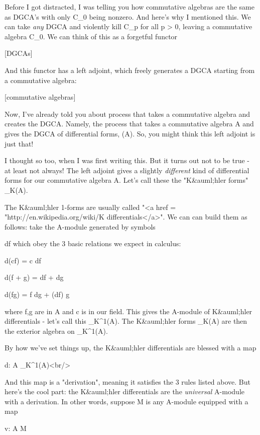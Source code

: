 Before I got distracted, I was telling you how commutative algebras
are the same as DGCA's with only C_{0} being nonzero.  And
here's why I mentioned this.  We can take \emph{any} DGCA and
violently kill C_{p} for all p > 0, leaving a commutative
algebra C_{0}.  We can think of this as a forgetful functor

[DGCAs] 

And this functor has a left adjoint, which freely generates a DGCA
starting from a commutative algebra:

[commutative algebras] \to  [DGCAs]

Now, I've already told you about process that takes a commutative 
algebra and creates the DGCA.  Namely, the process that takes a
commutative algebra A and gives the DGCA of differential forms, 
\Omega (A).  So, you might think this left adjoint is just that!

I thought so too, when I was first writing this.  But it turns out not
to be true - at least not always!  The left adjoint gives a slightly
\emph{different} kind of differential forms for our commutative
algebra A.  Let's call these the "K&auml;hler forms"
\Omega _{K}(A).

The K&auml;hler 1-forms are usually called "<a href =
"http://en.wikipedia.org/wiki/K%
differentials</a>".  We can can build them as follows: take the
A-module generated by symbols

df
which obey the 3 basic relations we expect in calculus:

d(cf) = c df

d(f + g) = df + dg

d(fg) = f dg + (df) g

where f,g are in A and c is in our field.  This gives the A-module of
K&auml;hler differentials - let's call this
\Omega _{K}^{1}(A).  The K&auml;hler forms
\Omega _{K}(A) are then the exterior algebra on
\Omega _{K}^{1}(A).

By how we've set things up, the K&auml;hler differentials 
are blessed with a map

d: A  \to  \Omega _{K}^{1}(A)<br/>

And this map is a "derivation",
meaning it satisfies the 3 rules listed above.
But here's the cool part: the K&auml;hler differentials are the
\emph{universal} A-module with a derivation.  In other words, suppose
M is any A-module equipped with a map

v: A \to  M

